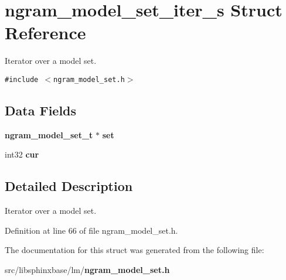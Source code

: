 \section{ngram\_\-model\_\-set\_\-iter\_\-s Struct Reference}
\label{structngram__model__set__iter__s}
Iterator over a model set.  


{\tt \#include $<$ngram\_\-model\_\-set.h$>$}

\subsection*{Data Fields}
\begin{CompactItemize}
\item 
{\bf ngram\_\-model\_\-set\_\-t} $\ast$ \textbf{set}\label{structngram__model__set__iter__s_c03199d884b9ed641141a1512f87b0cc}

\item 
int32 \textbf{cur}\label{structngram__model__set__iter__s_fe1dd087a0beb86a29549785ab394f91}

\end{CompactItemize}


\subsection{Detailed Description}
Iterator over a model set. 

Definition at line 66 of file ngram\_\-model\_\-set.h.

The documentation for this struct was generated from the following file:\begin{CompactItemize}
\item 
src/libsphinxbase/lm/{\bf ngram\_\-model\_\-set.h}\end{CompactItemize}
